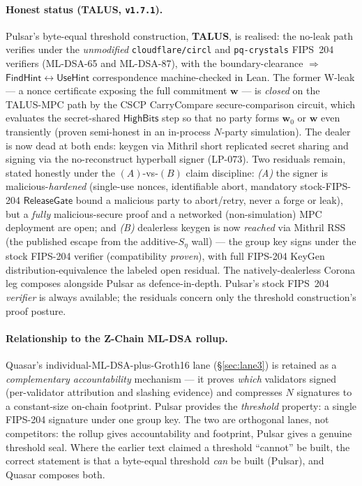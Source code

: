 \paragraph{Honest status (TALUS, \texttt{v1.7.1}).}  Pulsar's byte-equal
threshold construction, \textbf{TALUS}, is realised: the no-leak path
verifies under the \emph{unmodified} \texttt{cloudflare/circl} and
\texttt{pq-crystals} FIPS~204 verifiers (ML-DSA-65 and ML-DSA-87), with the
boundary-clearance $\Rightarrow$ $\mathsf{FindHint}\leftrightarrow
\mathsf{UseHint}$ correspondence machine-checked in Lean.  The former
W-leak --- a nonce certificate exposing the full commitment $\mathbf{w}$ ---
is \emph{closed} on the TALUS-MPC path by the CSCP CarryCompare
secure-comparison circuit, which evaluates the secret-shared
$\mathsf{HighBits}$ step so that no party forms $\mathbf{w}_0$ or
$\mathbf{w}$ even transiently (proven semi-honest in an in-process
$N$-party simulation).  The dealer is now dead at both ends: keygen via
Mithril short replicated secret sharing and signing via the no-reconstruct
hyperball signer (LP-073). Two residuals remain, stated honestly under the
$(A)$-vs-$(B)$ claim discipline: \emph{(A)} the signer is
malicious-\emph{hardened} (single-use nonces, identifiable abort, mandatory
stock-FIPS-204 $\mathsf{ReleaseGate}$ bound a malicious party to
abort/retry, never a forge or leak), but a \emph{fully} malicious-secure
proof and a networked (non-simulation) MPC deployment are open; and
\emph{(B)} dealerless keygen is now \emph{reached} via Mithril RSS (the
published escape from the additive-$S_\eta$ wall) --- the group key signs
under the stock FIPS-204 verifier (compatibility \emph{proven}), with full
FIPS-204 KeyGen distribution-equivalence the labeled open residual. The
natively-dealerless Corona leg composes alongside Pulsar as
defence-in-depth. Pulsar's stock FIPS~204 \emph{verifier} is always
available; the residuals concern only the threshold construction's proof
posture.

\paragraph{Relationship to the Z-Chain ML-DSA rollup.}  Quasar's
individual-ML-DSA-plus-Groth16 lane (\S\ref{sec:lane3}) is retained as a
\emph{complementary accountability} mechanism --- it proves \emph{which}
validators signed (per-validator attribution and slashing evidence) and
compresses $N$ signatures to a constant-size on-chain footprint.  Pulsar
provides the \emph{threshold} property: a single FIPS-204 signature
under one group key.  The two are orthogonal lanes, not competitors:
the rollup gives accountability and footprint, Pulsar gives a genuine
threshold seal.  Where the earlier text claimed a threshold ``cannot''
be built, the correct statement is that a byte-equal threshold
\emph{can} be built (Pulsar), and Quasar composes both.

